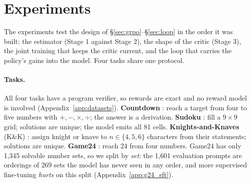 \section{Experiments}
\label{sec:experiments}
The experiments test the design of \S\ref{sec:grpo}--\S\ref{sec:loop} in the order it was built: the estimator (Stage 1 against Stage 2), the shape of the critic (Stage 3), the joint training that keeps the critic current, and the loop that carries the policy's gains into the model. Four tasks share one protocol.

\paragraph{Tasks.}
All four tasks have a program verifier, so rewards are exact and no reward model is involved (Appendix~\ref{app:datasets}). \textbf{Countdown} \citep{gandhi2024sos}: reach a target from four to five numbers with $+,-,\times,\div$; the answer is a derivation. \textbf{Sudoku} \citep{shah2024sudoku}: fill a $9\times9$ grid; solutions are unique; the model emits all 81 cells. \textbf{Knights-and-Knaves} (K\&K) \citep{xie2024kk}: assign knight or knave to $n\in\{4,5,6\}$ characters from their statements; solutions are unique. \textbf{Game24} \citep{yao2023tot}: reach 24 from four numbers. Game24 has only 1{,}345 solvable number sets, so we split by \emph{set}: the 1{,}601 evaluation prompts are orderings of 269 sets the model has never seen in any order, and more supervised fine-tuning \emph{hurts} on this split (Appendix~\ref{app:g24_sft}).

